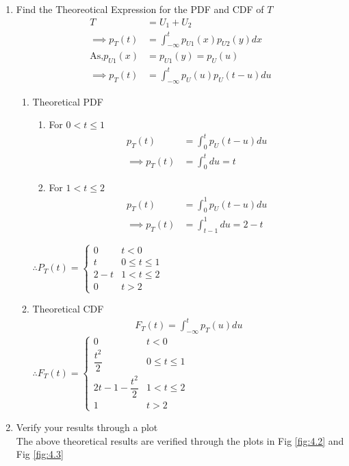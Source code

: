 \documentclass[journal,12pt,twocolumn]{IEEEtran}
\renewcommand\thesection{\arabic{section}}
\begin{document}
\begin{enumerate}[label=\thesection.\arabic*
,ref=\thesection.\theenumi]
\item Find the Theoreotical Expression for the PDF and CDF of $T$\\
\solution
\begin{align}
    T&=U_1+U_2\\
    \implies p_T(t)&=\int_{-\infty}^{t}p_{U1}(x)p_{U2}(y)dx\\
    \text{As,}p_{U1}(x)&=p_{U1}(y)=p_{U}(u)\\
    \implies p_T(t)&=\int_{-\infty}^{t}p_{U}(u)p_{U}(t-u)du
    \end{align}
    \begin{enumerate}
        \item Theoretical PDF 
        \begin{enumerate}
            \item For $0 < t\le 1$
            \begin{align}
                p_T(t)&=\int_{0}^{t}p_{U}(t-u)du\\
                \implies p_T(t)&=\int_{0}^{t} du=t
            \end{align}
            \item For $1 < t \le 2$
             \begin{align}
                p_T(t)&=\int_{0}^{1}p_{U}(t-u)du\\
                \implies p_T(t)&=\int_{t-1}^{1} du=2-t
            \end{align}
        \end{enumerate}
        $\therefore P_T(t) =
        \begin{cases}
         0     & t<0 \\
         t     &0 \le t \le 1 \\
         2-t   &1 < t \le 2\\
         0     &t>2
        \end{cases}
        $\\
        \item Theoretical CDF 
        \begin{align}
            F_T(t)=\int_{-\infty}^{t}p_T(u)du
        \end{align}
        $\therefore
            F_{T}(t)=
            \begin{cases}
             0   &t<0\\
             \dfrac{t^2}{2} &0\le t \le 1\\
             2t-1-\dfrac{t^2}{2} &1<t \le 2\\
             1 &t>2
            \end{cases}
            $\\
            \end{enumerate}
            
            \item Verify your results through a plot \\
\solution The above theoretical results are verified through the plots in
Fig \ref{fig:4.2} and Fig \ref{fig:4.3}
\end{enumerate}
\end{document}
